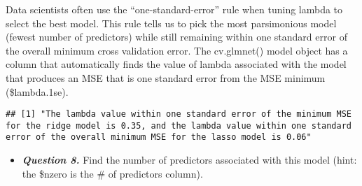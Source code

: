 \documentclass[
]{article}
\newenvironment{Shaded}{\begin{snugshade}}{\end{snugshade}}
\newcommand{\CommentTok}[1]{\textcolor[rgb]{0.56,0.35,0.01}{\textit{#1}}}
\newcommand{\DecValTok}[1]{\textcolor[rgb]{0.00,0.00,0.81}{#1}}
\newcommand{\FloatTok}[1]{\textcolor[rgb]{0.00,0.00,0.81}{#1}}
\newcommand{\FunctionTok}[1]{\textcolor[rgb]{0.00,0.00,0.00}{#1}}
\newcommand{\NormalTok}[1]{#1}
\newcommand{\SpecialCharTok}[1]{\textcolor[rgb]{0.00,0.00,0.00}{#1}}
\newcommand{\StringTok}[1]{\textcolor[rgb]{0.31,0.60,0.02}{#1}}
\providecommand{\tightlist}{%
  \setlength{\itemsep}{0pt}\setlength{\parskip}{0pt}}
\begin{document}
Data scientists often use the ``one-standard-error'' rule when tuning
lambda to select the best model. This rule tells us to pick the most
parsimonious model (fewest number of predictors) while still remaining
within one standard error of the overall minimum cross validation error.
The cv.glmnet() model object has a column that automatically finds the
value of lambda associated with the model that produces an MSE that is
one standard error from the MSE minimum (\$lambda.1se).

\begin{Shaded}
\end{Shaded}

\begin{verbatim}
## [1] "The lambda value within one standard error of the minimum MSE for the ridge model is 0.35, and the lambda value within one standard error of the overall minimum MSE for the lasso model is 0.06"
\end{verbatim}

\begin{itemize}
\tightlist
\item
  \textbf{\emph{Question 8.}} Find the number of predictors associated
  with this model (hint: the \$nzero is the \# of predictors column).
\end{itemize}

\begin{Shaded}
\end{Shaded}
\end{document}
